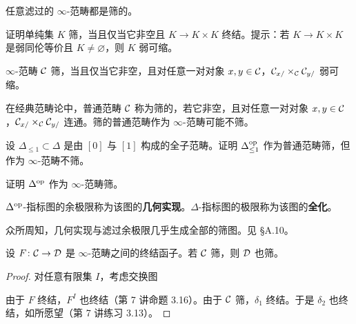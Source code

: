 \begin{example}\label{L10-4.4}
任意滤过的 $\infty$-范畴都是筛的。
\end{example}

\begin{exercise}\label{L10-4.5}
证明单纯集 $K$ 筛，当且仅当它非空且 $K\to K\times K$ 终结。提示：若 $K\to K\times K$ 是弱同伦等价且 $K\neq\varnothing$，则 $K$ 弱可缩。
\end{exercise}

\begin{corollary}\label{L10-4.6}
$\infty$-范畴 $\mathcal{C}$ 筛，当且仅当它非空，且对任意一对对象 $x,y\in\mathcal{C}$，$\mathcal{C}_{x/}\times_{\mathcal{C}}\mathcal{C}_{y/}$ 弱可缩。
\end{corollary}

\begin{warning}\label{L10-4.7}
在经典范畴论中，普通范畴 $\mathcal{C}$ 称为筛的，若它非空，且对任意一对对象 $x,y\in\mathcal{C}$，$\mathcal{C}_{x/}\times_{\mathcal{C}}\mathcal{C}_{y/}$ 连通。筛的普通范畴作为 $\infty$-范畴可能不筛。
\end{warning}

\begin{exercise}\label{L10-4.8}
设 $\Delta_{\le 1}\subset\Delta$ 是由 $[0]$ 与 $[1]$ 构成的全子范畴。证明 $\Delta_{\le 1}^{\mathrm{op}}$ 作为普通范畴筛，但作为 $\infty$-范畴不筛。
\end{exercise}

\begin{exercise}\label{L10-4.9}
证明 $\Delta^{\mathrm{op}}$ 作为 $\infty$-范畴筛。
\end{exercise}

\begin{definition}\label{L10-4.10}
$\Delta^{\mathrm{op}}$-指标图的余极限称为该图的\textbf{几何实现}。$\Delta$-指标图的极限称为该图的\textbf{全化}。
\end{definition}

\nitem\label{L10-4.11} 众所周知，几何实现与滤过余极限几乎生成全部的筛图。见 §A.10。

\begin{proposition}\label{L10-4.12}
设 $F\colon\mathcal{C}\to\mathcal{D}$ 是 $\infty$-范畴之间的终结函子。若 $\mathcal{C}$ 筛，则 $\mathcal{D}$ 也筛。
\end{proposition}

\begin{proof}
对任意有限集 $I$，考虑交换图
\begin{center}
\end{center}
由于 $F$ 终结，$F^I$ 也终结（第 7 讲命题 3.16）。由于 $\mathcal{C}$ 筛，$\delta_1$ 终结。于是 $\delta_2$ 也终结，如所愿望（第 7 讲练习 3.13）。
\end{proof}

